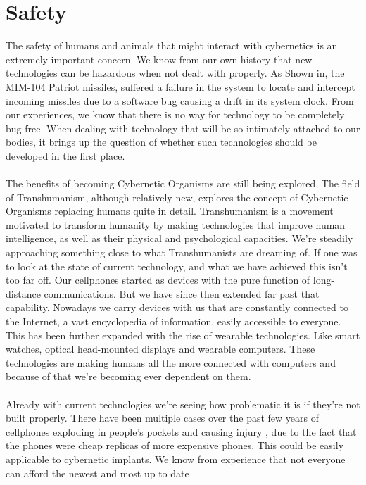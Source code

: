 \documentclass[12pt,a4paper,notitlepage]{article}
\begin{document}
\section{Safety}
The safety of humans and animals that might interact with cybernetics is an
extremely important concern. We know from our own history that new technologies
can be hazardous when not dealt with properly. As Shown in, the MIM-104 Patriot
missiles, suffered a failure in the system to locate and intercept incoming
missiles due to a software bug causing a drift in its system clock.  From our
experiences, we know that there is no way for technology to be completely bug
free. When dealing with technology that will be so intimately attached to our
bodies, it brings up the question of whether such technologies should be
developed in the first place. 
\\\\
The benefits of becoming Cybernetic Organisms are still being explored.  The
field of Transhumanism\cite{Transhumanism}, although relatively new, explores
the concept of Cybernetic Organisms replacing humans quite in detail.
Transhumanism is a movement motivated to transform humanity by making
technologies that improve human intelligence, as well as their physical and
psychological capacities. We're steadily approaching something close to what
Transhumanists are dreaming of. If one was to look at the state of current
technology, and what we have achieved this isn't too far off. Our cellphones
started as devices with the pure function of long-distance communications. But
we have since then extended far past that capability. Nowadays we carry devices
with us that are constantly connected to the Internet, a vast encyclopedia of
information, easily accessible to everyone.  This has been further expanded with
the rise of wearable technologies. Like smart watches, optical head-mounted
displays and wearable computers. These technologies are making humans all the
more connected with computers and because of that we're becoming ever dependent
on them.
\\\\
Already with current technologies we're seeing how problematic it is if they're
not built properly. There have been  multiple cases over the past few years of
cellphones exploding in people's pockets and causing injury  \cite{exploding
cellphone}, due to the fact that the phones were cheap replicas of more
expensive phones. This could be easily applicable to cybernetic implants. We
know from experience that not everyone can afford the newest and most up to date
\end{document}
